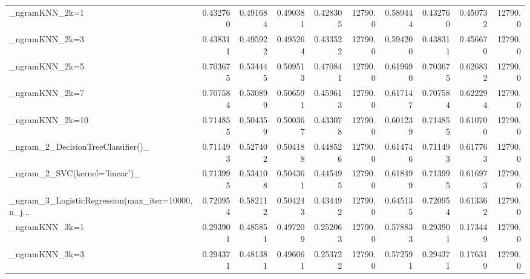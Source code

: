 \begin{tabular}{lrrrrrrrrr}
\_ngramKNN\_2k=1                                     &  0.432760 &         0.491684 &      0.490381 &        0.428305 &        12790.0 &            0.589444 &         0.432760 &           0.450732 &           12790.0 \\
\_ngramKNN\_2k=3                                     &  0.438311 &         0.495922 &      0.495264 &        0.433522 &        12790.0 &            0.594200 &         0.438311 &           0.456670 &           12790.0 \\
\_ngramKNN\_2k=5                                     &  0.703675 &         0.534445 &      0.509513 &        0.470841 &        12790.0 &            0.619690 &         0.703675 &           0.626832 &           12790.0 \\
\_ngramKNN\_2k=7                                     &  0.707584 &         0.530899 &      0.506591 &        0.459613 &        12790.0 &            0.617147 &         0.707584 &           0.622294 &           12790.0 \\
\_ngramKNN\_2k=10                                    &  0.714855 &         0.504359 &      0.500367 &        0.433078 &        12790.0 &            0.601239 &         0.714855 &           0.610700 &           12790.0 \\
\_ngram\_2\_DecisionTreeClassifier()\_                 &  0.711493 &         0.527402 &      0.504188 &        0.448526 &        12790.0 &            0.614746 &         0.711493 &           0.617763 &           12790.0 \\
\_ngram\_2\_SVC(kernel='linear')\_                     &  0.713995 &         0.534108 &      0.504361 &        0.445495 &        12790.0 &            0.618499 &         0.713995 &           0.616973 &           12790.0 \\
\_ngram\_3\_LogisticRegression(max\_iter=10000, n\_j... &  0.720954 &         0.582112 &      0.504243 &        0.434492 &        12790.0 &            0.645135 &         0.720954 &           0.613362 &           12790.0 \\
\_ngramKNN\_3k=1                                     &  0.293901 &         0.485851 &      0.497209 &        0.252063 &        12790.0 &            0.578833 &         0.293901 &           0.173449 &           12790.0 \\
\_ngramKNN\_3k=3                                     &  0.294371 &         0.481381 &      0.496061 &        0.253722 &        12790.0 &            0.572591 &         0.294371 &           0.176319 &           12790.0 \\

\end{tabular}
